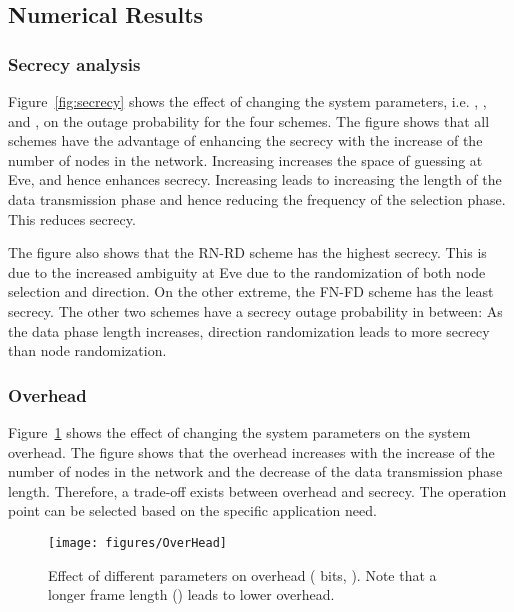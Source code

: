 \documentclass[10pt,letterpaper,conference]{IEEEtran}
\begin{document}
\subsection{Numerical Results}
\subsubsection{Secrecy analysis}
Figure~\ref{fig:secrecy} shows the effect of changing the system parameters,
i.e. , , and , on the outage probability for the four schemes. The
figure shows that all schemes have the advantage of enhancing the secrecy with
the increase of the number of nodes in the network. Increasing  increases the
space of guessing at Eve, and hence enhances secrecy. Increasing  leads
to increasing the length of the data transmission phase and hence reducing the
frequency of the selection phase. This reduces secrecy.

The figure also shows that the RN-RD scheme has the highest secrecy. This is due
to the increased ambiguity at Eve due to the randomization of both node
selection and direction. On the other extreme, the FN-FD scheme has the least secrecy.
The other two schemes have a secrecy outage probability in between: As the data
phase length increases, direction randomization leads to more secrecy than node
randomization.

\subsubsection{Overhead}
Figure~\ref{fig:overhead} shows the effect of changing the system parameters on
the system overhead. The figure shows that the overhead increases with
the increase of the number of nodes in the network and the decrease of the data
transmission phase length. Therefore, a trade-off exists between overhead and
secrecy. The operation point can be selected based on the specific application
need.

\begin{figure}[!t]
\centering
\texttt{[image: figures/OverHead]}
\caption{Effect of different parameters on overhead ( bits, ). Note that a longer frame length () leads to lower overhead.}
\label{fig:overhead}
\end{figure}
\end{document}
